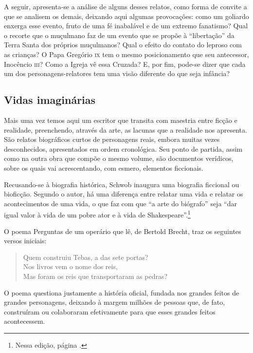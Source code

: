A seguir, apresenta-se a análise de alguns desses relatos, como forma de
convite a que se analisem os demais, deixando aqui algumas provocações:
como um goliardo enxerga esse evento, fruto de uma fé inabalável e de um
extremo fanatismo? Qual o recorte que o muçulmano faz de um evento que
se propõe à ``libertação'' da Terra Santa dos próprios muçulmanos? Qual
o efeito do contato do leproso com as crianças? O Papa Gregório \textsc{ix} tem o
mesmo posicionamento que seu antecessor, Inocêncio \textsc{iii}? Como a Igreja vê
essa Cruzada? E, por fim, pode-se dizer que cada um dos
personagens-relatores tem uma visão diferente do que seja infância?

\subsection{Vidas imaginárias}

Mais uma vez temos aqui um escritor que transita com maestria entre
ficção e realidade, preenchendo, através da arte, as lacunas que a
realidade nos apresenta. São relatos biográficos curtos de personagens
reais, embora muitas vezes desconhecidos, apresentados em ordem
cronológica. Seu ponto de partida, assim como na outra obra que compõe o
mesmo volume, são documentos verídicos, sobre os quais vai
acrescentando, com esmero, elementos ficcionais.

Recusando-se à biografia histórica, Schwob inaugura uma biografia
ficcional ou bioficção. Segundo o autor, há uma diferença entre relatar
uma vida e relatar os acontecimentos de uma vida, o que faz com que ``a
arte do biógrafo'' seja ``dar igual valor à vida de um pobre ator e à
vida de Shakespeare''.\footnote{Nessa edição, página \pageref{vida}.}

O poema Perguntas de um operário que lê, de Bertold Brecht, traz os
seguintes versos iniciais:

\begin{verse}
Quem construiu Tebas, a das sete portas?\\
Nos livros vem o nome dos reis,\\
Mas foram os reis que transportaram as pedras?\\
\end{verse}

O poema questiona justamente a história oficial, fundada nos grandes
feitos de grandes personagens, deixando à margem milhões de pessoas que,
de fato, construíram ou colaboraram efetivamente para que esses grandes
feitos acontecessem.


